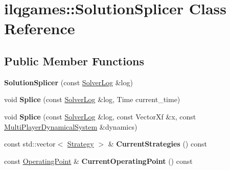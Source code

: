 \hypertarget{classilqgames_1_1_solution_splicer}{}\section{ilqgames\+:\+:Solution\+Splicer Class Reference}
\label{classilqgames_1_1_solution_splicer}
\subsection*{Public Member Functions}
\begin{DoxyCompactItemize}
\item 
{\bfseries Solution\+Splicer} (const \hyperlink{classilqgames_1_1_solver_log}{Solver\+Log} \&log)\hypertarget{classilqgames_1_1_solution_splicer_add264f103d0c16f989549ba4d030d13e}{}\label{classilqgames_1_1_solution_splicer_add264f103d0c16f989549ba4d030d13e}

\item 
void {\bfseries Splice} (const \hyperlink{classilqgames_1_1_solver_log}{Solver\+Log} \&log, Time current\+\_\+time)\hypertarget{classilqgames_1_1_solution_splicer_a24336ebf818cb129742b41884c5043a0}{}\label{classilqgames_1_1_solution_splicer_a24336ebf818cb129742b41884c5043a0}

\item 
void {\bfseries Splice} (const \hyperlink{classilqgames_1_1_solver_log}{Solver\+Log} \&log, const Vector\+Xf \&x, const \hyperlink{classilqgames_1_1_multi_player_dynamical_system}{Multi\+Player\+Dynamical\+System} \&dynamics)\hypertarget{classilqgames_1_1_solution_splicer_a3aaac8760d3009caceb5880b65c0abd0}{}\label{classilqgames_1_1_solution_splicer_a3aaac8760d3009caceb5880b65c0abd0}

\item 
const std\+::vector$<$ \hyperlink{structilqgames_1_1_strategy}{Strategy} $>$ \& {\bfseries Current\+Strategies} () const \hypertarget{classilqgames_1_1_solution_splicer_ab513525045570c0156ce8855fbe49871}{}\label{classilqgames_1_1_solution_splicer_ab513525045570c0156ce8855fbe49871}

\item 
const \hyperlink{structilqgames_1_1_operating_point}{Operating\+Point} \& {\bfseries Current\+Operating\+Point} () const \hypertarget{classilqgames_1_1_solution_splicer_aa9986a86a6dead3dbe781c6dfa5d6745}{}\label{classilqgames_1_1_solution_splicer_aa9986a86a6dead3dbe781c6dfa5d6745}

\end{DoxyCompactItemize}


